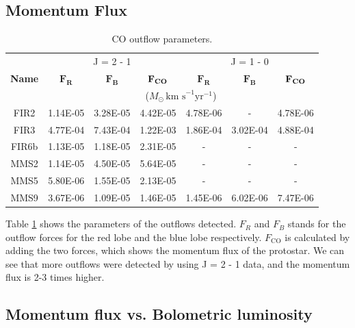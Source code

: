 \subsection{Momentum Flux}


\begin{table}[h]
	\caption{CO outflow parameters.} \label{result}
	\begin{center}
		\begin{tabular}{c|c|c|c||c|c|c}
			\toprule
			\multirow{3}{1cm}{\textbf{Name}} & \multicolumn{3}{c}{J = 2 - 1} & \multicolumn{3}{c}{J = 1 - 0} \\
			& $\mathbf{F_{R}}$ & $\mathbf{F_{B}}$ & $\mathbf{F_{\textrm{\textbf{CO}}}}$ & $\mathbf{F_{R}}$ & $\mathbf{F_{B}}$ & $\mathbf{F_{\textrm{\textbf{CO}}}}$\\
			& \multicolumn{6}{c}{($M_{\odot} \, \textrm{km s}^{-1} \textrm{yr}^{-1}$)}\\
			\midrule
			FIR2 & 1.14E-05 & 3.28E-05 & 4.42E-05 & 4.78E-06 & - & 4.78E-06\\
			FIR3 & 4.77E-04 & 7.43E-04 & 1.22E-03 & 1.86E-04 & 3.02E-04 & 4.88E-04\\
			FIR6b & 1.13E-05 & 1.18E-05 & 2.31E-05 & - & - & -\\
			MMS2 & 1.14E-05 & 4.50E-05 & 5.64E-05 & - & - & -\\
			MMS5 & 5.80E-06 & 1.55E-05 & 2.13E-05 & - & - & -\\
			MMS9 & 3.67E-06 & 1.09E-05 & 1.46E-05 & 1.45E-06 & 6.02E-06 & 7.47E-06\\
			\toprule
		\end{tabular}
	\end{center}
\end{table}


Table \noindent\ref{result} shows the parameters of the outflows detected. $F_R$ and $F_B$ stands for the outflow forces for the red lobe and the blue lobe respectively. $F_{\textrm{CO}}$ is calculated by adding the two forces, which shows the momentum flux of the protostar. We can see that more outflows were detected by using J = 2 - 1 data, and the momentum flux is 2-3 times higher.\\

\clearpage
\newpage
\subsection{Momentum flux vs. Bolometric luminosity}

